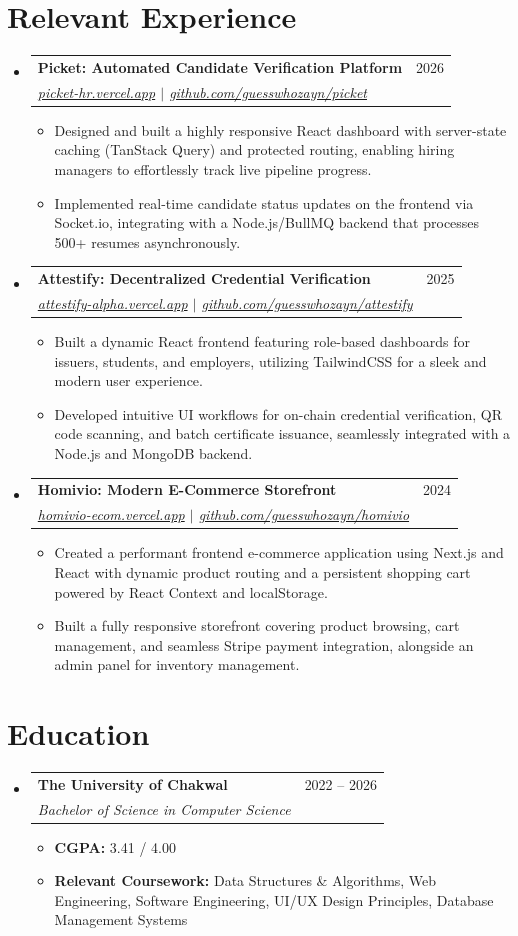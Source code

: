 \documentclass[letterpaper,11pt]{article}
\makeatletter
\newcommand{\resumeItem}[1]{
  \item\small{#1 \vspace{-2pt}}
}
\newcommand{\resumeSubheading}[4]{
  \vspace{-2pt}\item
    \begin{tabular*}{0.97\textwidth}[t]{l@{\extracolsep{\fill}}r}
      \textbf{#1} & #2 \\
      \textit{\small#3} & \textit{\small #4} \\
    \end{tabular*}\vspace{-7pt}
}
\newcommand{\resumeSubHeadingListStart}{\begin{itemize}[leftmargin=0.15in, label={}]}
\newcommand{\resumeSubHeadingListEnd}{\end{itemize}}
\newcommand{\resumeItemListStart}{\begin{itemize}}
\newcommand{\resumeItemListEnd}{\end{itemize}\vspace{-5pt}}
\makeatother
\begin{document}
\section{Relevant Experience}
\resumeSubHeadingListStart

  \resumeSubheading
    {Picket: Automated Candidate Verification Platform}{2026}
    {\href{https://picket-hr.vercel.app}{picket-hr.vercel.app} $|$ \href{https://github.com/guesswhozayn/picket}{github.com/guesswhozayn/picket}}{}
    \resumeItemListStart
      \resumeItem{Designed and built a highly responsive React dashboard with server-state caching (TanStack Query) and protected routing, enabling hiring managers to effortlessly track live pipeline progress.}
      \resumeItem{Implemented real-time candidate status updates on the frontend via Socket.io, integrating with a Node.js/BullMQ backend that processes 500+ resumes asynchronously.}
    \resumeItemListEnd

  \resumeSubheading
    {Attestify: Decentralized Credential Verification}{2025}
    {\href{https://attestify-alpha.vercel.app}{attestify-alpha.vercel.app} $|$ \href{https://github.com/guesswhozayn/attestify}{github.com/guesswhozayn/attestify}}{}
    \resumeItemListStart
      \resumeItem{Built a dynamic React frontend featuring role-based dashboards for issuers, students, and employers, utilizing TailwindCSS for a sleek and modern user experience.}
      \resumeItem{Developed intuitive UI workflows for on-chain credential verification, QR code scanning, and batch certificate issuance, seamlessly integrated with a Node.js and MongoDB backend.}
    \resumeItemListEnd

  \resumeSubheading
    {Homivio: Modern E-Commerce Storefront}{2024}
    {\href{https://homivio-ecom.vercel.app}{homivio-ecom.vercel.app} $|$ \href{https://github.com/guesswhozayn/homivio}{github.com/guesswhozayn/homivio}}{}
    \resumeItemListStart
      \resumeItem{Created a performant frontend e-commerce application using Next.js and React with dynamic product routing and a persistent shopping cart powered by React Context and localStorage.}
      \resumeItem{Built a fully responsive storefront covering product browsing, cart management, and seamless Stripe payment integration, alongside an admin panel for inventory management.}
    \resumeItemListEnd

\resumeSubHeadingListEnd

\section{Education}
\resumeSubHeadingListStart
  \resumeSubheading
    {The University of Chakwal}{2022 -- 2026}
    {Bachelor of Science in Computer Science}{}
    \resumeItemListStart
      \resumeItem{\textbf{CGPA:} 3.41 / 4.00}
      \resumeItem{\textbf{Relevant Coursework:} Data Structures \& Algorithms, Web Engineering, Software Engineering, UI/UX Design Principles, Database Management Systems}
    \resumeItemListEnd
\resumeSubHeadingListEnd
\end{document}
